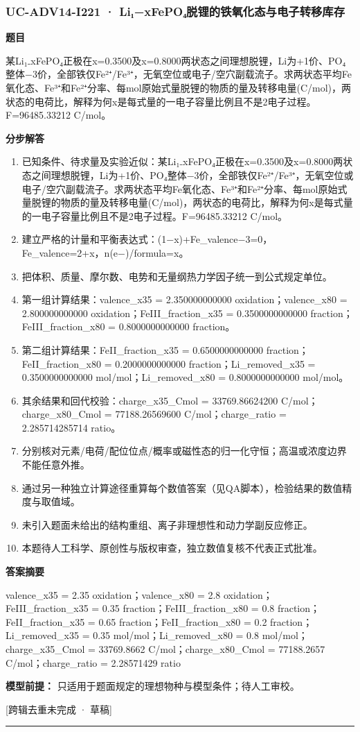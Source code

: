 \documentclass[UTF8,11pt,a4paper]{ctexart}
\begin{document}
\subsubsection*{UC-ADV14-I221 · Li₁−xFePO₄脱锂的铁氧化态与电子转移库存}
\noindent\textbf{题目}\par
某Li₁₋xFePO₄正极在x=0.3500及x=0.8000两状态之间理想脱锂，Li为+1价、PO₄整体−3价，全部铁仅Fe²⁺/Fe³⁺，无氧空位或电子/空穴副载流子。求两状态平均Fe氧化态、Fe³⁺和Fe²⁺分率、每mol原始式量脱锂的物质的量及转移电量(C/mol)，两状态的电荷比，解释为何x是每式量的一电子容量比例且不是2电子过程。F=96485.33212 C/mol。\par
\medskip\noindent\textbf{分步解答}
\begin{enumerate}
\item 已知条件、待求量及实验近似：某Li₁₋xFePO₄正极在x=0.3500及x=0.8000两状态之间理想脱锂，Li为+1价、PO₄整体−3价，全部铁仅Fe²⁺/Fe³⁺，无氧空位或电子/空穴副载流子。求两状态平均Fe氧化态、Fe³⁺和Fe²⁺分率、每mol原始式量脱锂的物质的量及转移电量(C/mol)，两状态的电荷比，解释为何x是每式量的一电子容量比例且不是2电子过程。F=96485.33212 C/mol。
\item 建立严格的计量和平衡表达式：(1−x)+Fe\_valence−3=0，Fe\_valence=2+x，n(e−)/formula=x。
\item 把体积、质量、摩尔数、电势和无量纲热力学因子统一到公式规定单位。
\item 第一组计算结果：valence\_x35 = 2.350000000000 oxidation；valence\_x80 = 2.800000000000 oxidation；FeIII\_fraction\_x35 = 0.3500000000000 fraction；FeIII\_fraction\_x80 = 0.8000000000000 fraction。
\item 第二组计算结果：FeII\_fraction\_x35 = 0.6500000000000 fraction；FeII\_fraction\_x80 = 0.2000000000000 fraction；Li\_removed\_x35 = 0.3500000000000 mol/mol；Li\_removed\_x80 = 0.8000000000000 mol/mol。
\item 其余结果和回代校验：charge\_x35\_Cmol = 33769.86624200 C/mol；charge\_x80\_Cmol = 77188.26569600 C/mol；charge\_ratio = 2.285714285714 ratio。
\item 分别核对元素/电荷/配位位点/概率或磁性态的归一化守恒；高温或浓度边界不能任意外推。
\item 通过另一种独立计算途径重算每个数值答案（见QA脚本），检验结果的数值精度与取值域。
\item 未引入题面未给出的结构重组、离子非理想性和动力学副反应修正。
\item 本题待人工科学、原创性与版权审查，独立数值复核不代表正式批准。
\end{enumerate}
\noindent\textbf{答案摘要}\par
valence\_x35 = 2.35 oxidation；valence\_x80 = 2.8 oxidation；FeIII\_fraction\_x35 = 0.35 fraction；FeIII\_fraction\_x80 = 0.8 fraction；FeII\_fraction\_x35 = 0.65 fraction；FeII\_fraction\_x80 = 0.2 fraction；Li\_removed\_x35 = 0.35 mol/mol；Li\_removed\_x80 = 0.8 mol/mol；charge\_x35\_Cmol = 33769.8662 C/mol；charge\_x80\_Cmol = 77188.2657 C/mol；charge\_ratio = 2.28571429 ratio\par
\noindent\textbf{模型前提：}
只适用于题面规定的理想物种与模型条件；待人工审校。\par
\noindent\textcolor{red!65!black}{[跨辑去重未完成 · 草稿]} \par
\medskip\hrule\medskip
{}
\end{document}
